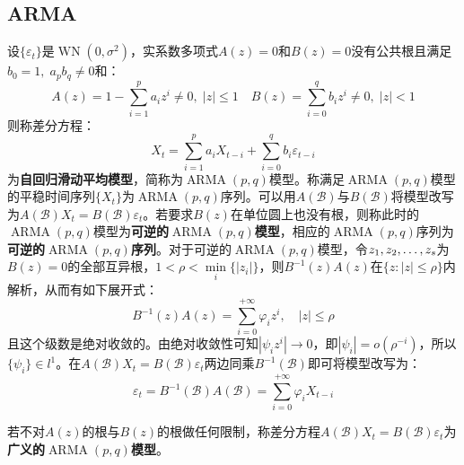\subsection{ARMA}
\begin{definition}
	设$\{\varepsilon_t\}$是$\operatorname{WN}(0,\sigma^2)$，实系数多项式$A(z)=0$和$B(z)=0$没有公共根且满足$b_0=1,\;a_pb_q\ne0$和：
	\begin{equation*}
		A(z)=1-\sum_{i=1}^{p}a_iz^i\ne0,\;|z|\leqslant1\quad B(z)=\sum_{i=0}^{q}b_iz^i\ne0,\;|z|<1
	\end{equation*}
	则称差分方程：
	\begin{equation*}
		X_t=\sum_{i=1}^{p}a_iX_{t-i}+\sum_{i=0}^{q}b_i\varepsilon_{t-i}
	\end{equation*}
	为\textbf{自回归滑动平均模型}，简称为$\operatorname{ARMA}(p,q)$模型。称满足$\operatorname{ARMA}(p,q)$模型的平稳时间序列$\{X_t\}$为$\operatorname{ARMA}(p,q)$序列。可以用$A(\mathcal{B})$与$B(\mathcal{B})$将模型改写为$A(\mathcal{B})X_t=B(\mathcal{B})\varepsilon_t$。若要求$B(z)$在单位圆上也没有根，则称此时的$\operatorname{ARMA}(p,q)$模型为\textbf{可逆的$\operatorname{ARMA}(p,q)$模型}，相应的$\operatorname{ARMA}(p,q)$序列为\textbf{可逆的$\operatorname{ARMA}(p,q)$序列}。对于可逆的$\operatorname{ARMA}(p,q)$模型，令$z_1, z_2, \dots, z_{s}$为$B(z)=0$的全部互异根，$1<\rho<\min\limits_i\{|z_i|\}$，则$B^{-1}(z)A(z)$在$\{z:|z|\leqslant\rho\}$内解析，从而有如下展开式：
	\begin{equation*}
		B^{-1}(z)A(z)=\sum_{i=0}^{+\infty}\varphi_iz^i,\quad|z|\leqslant\rho
	\end{equation*}
	且这个级数是绝对收敛的。由绝对收敛性可知$|\psi_iz^i|\to0$，即$|\psi_i|=o(\rho^{-i})$，所以$\{\psi_i\}\in l^1$。在$A(\mathcal{B})X_t=B(\mathcal{B})\varepsilon_t$两边同乘$B^{-1}(\mathcal{B})$即可将模型改写为：
	\begin{equation*}
		\varepsilon_t=B^{-1}(\mathcal{B})A(\mathcal{B})=\sum_{i=0}^{+\infty}\varphi_iX_{t-i}
	\end{equation*}\par
	若不对$A(z)$的根与$B(z)$的根做任何限制，称差分方程$A(\mathcal{B})X_t=B(\mathcal{B})\varepsilon_t$为\textbf{广义的$\operatorname{ARMA}(p,q)$模型}。
\end{definition}
